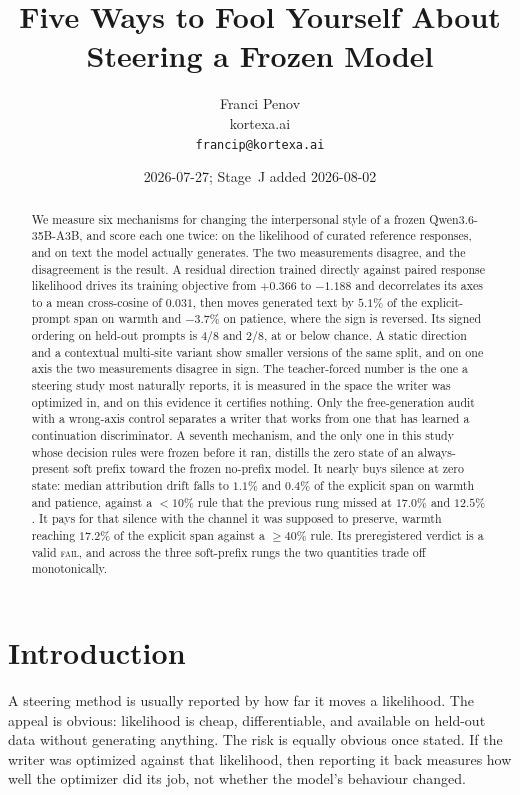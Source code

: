 \documentclass[10pt]{article}
\title{Five Ways to Fool Yourself About Steering a Frozen Model}
\author{Franci Penov \\ kortexa.ai \\ \texttt{francip@kortexa.ai}}
\date{2026-07-27; Stage~J added 2026-08-02}
\newcommand{\model}{Qwen3.6-35B-A3B}
\begin{document}
\maketitle

\begin{abstract}
We measure six mechanisms for changing the interpersonal style of a frozen
\model, and score each one twice: on the likelihood of curated reference
responses, and on text the model actually generates. The two measurements
disagree, and the disagreement is the result. A residual direction trained
directly against paired response likelihood drives its training objective from
$+0.366$ to $-1.188$ and decorrelates its axes to a mean cross-cosine of
$0.031$, then moves generated text by $5.1\%$ of the explicit-prompt span on
warmth and $-3.7\%$ on patience, where the sign is reversed. Its signed
ordering on held-out prompts is 4/8 and 2/8, at or below chance. A static
direction and a contextual multi-site variant show smaller versions of the same
split, and on one axis the two measurements disagree in sign. The teacher-forced
number is the one a steering study most naturally reports, it is measured in the
space the writer was optimized in, and on this evidence it certifies nothing.
Only the free-generation audit with a wrong-axis control separates a writer that
works from one that has learned a continuation discriminator. A seventh
mechanism, and the only one in this study whose decision rules were frozen
before it ran, distills the zero state of an always-present soft prefix toward
the frozen no-prefix model. It nearly buys silence at zero state: median
attribution drift falls to $1.1\%$ and $0.4\%$ of the explicit span on warmth
and patience, against a $<10\%$ rule that the previous rung missed at $17.0\%$
and $12.5\%$. It pays for that silence with the channel it was supposed to
preserve, warmth reaching $17.2\%$ of the explicit span against a $\geq 40\%$
rule. Its preregistered verdict is a valid \textsc{fail}, and across the three
soft-prefix rungs the two quantities trade off monotonically.
\end{abstract}

\section{Introduction}

A steering method is usually reported by how far it moves a likelihood. The
appeal is obvious: likelihood is cheap, differentiable, and available on
held-out data without generating anything. The risk is equally obvious once
stated. If the writer was optimized against that likelihood, then reporting it
back measures how well the optimizer did its job, not whether the model's
behaviour changed.
\end{document}
